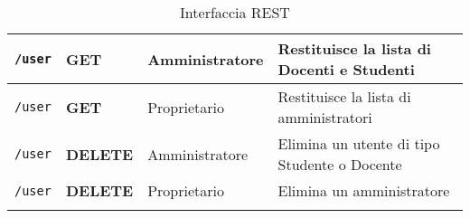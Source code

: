 \documentclass[12pt,a4paper]{article}
\begin{document}
\begin{center}
\begin{longtable}[H]{p{} p{} p{} p{}}
		\midrule
		\midrule
		\texttt{/user} & \textbf{GET} & Amministratore & Restituisce la lista di Docenti e Studenti \\*
		\midrule
		\texttt{/user} & \textbf{GET} & Proprietario & Restituisce la lista di amministratori\\*
		\midrule
		\texttt{/user} & \textbf{DELETE} & Amministratore & Elimina un utente di tipo Studente o Docente \\*
		\midrule
		\texttt{/user} & \textbf{DELETE} & Proprietario & Elimina un amministratore \\*
		
		\bottomrule
		\caption{Interfaccia REST}
		\label{tab:intrest}
	\end{longtable}
\end{center}
\end{document}

